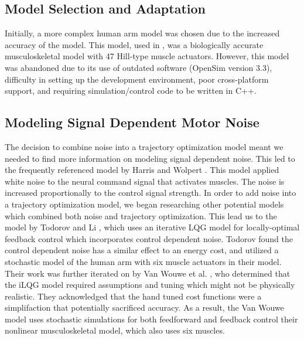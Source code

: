 \documentclass[letterpaper, 10pt, conference]{ieeeconf}
\begin{document}
\subsection{Model Selection and Adaptation}

Initially, a more complex human arm model was chosen due to the increased accuracy of the model. This model, used in \cite{c5}, was a biologically accurate musculoskeletal model with 47 Hill-type muscle actuators. However, this model was abandoned due to its use of outdated software (OpenSim version 3.3), difficulty in setting up the development environment, poor cross-platform support, and requiring simulation/control code to be written in C++.

\subsection{Modeling Signal Dependent Motor Noise}
The decision to combine noise into a trajectory optimization model meant we needed to find more information on modeling signal dependent noise. This led to the frequently referenced model by Harris and Wolpert \cite{c2}. This model applied white noise to the neural command signal that activates muscles. The noise is increased proportionally to the control signal strength. In order to add noise into a trajectory optimization model, we began researching other potential models which combined both noise and trajectory optimization. This lead us to the model by Todorov and Li \cite{c8}, which uses an iterative LQG model for locally-optimal feedback control which incorporates control dependent noise. Todorov found the control dependent noise has a similar effect to an energy cost, and utilized a stochastic model of the human arm with six muscle actuators in their model. Their work was further iterated on by Van Wouwe et al. \cite{c7}, who determined that the iLQG model required assumptions and tuning which might not be physically realistic. They acknowledged that the hand tuned cost functions were a simplifaction that potentially sacrificed accuracy. As a result, the Van Wouwe model uses stochastic simulations for both feedforward and feedback control their nonlinear musculoskeletal model, which also uses six muscles. 
\end{document}

